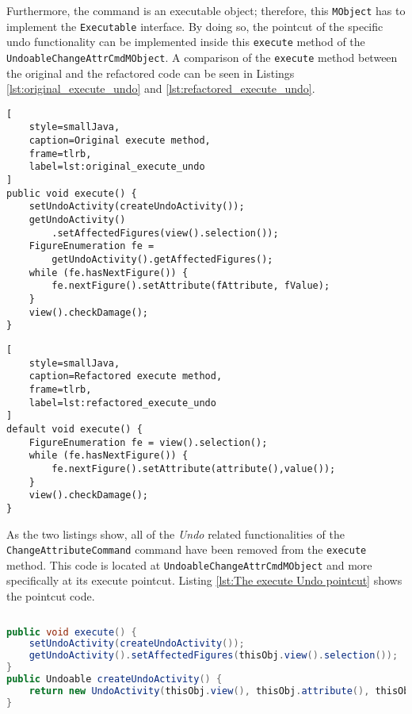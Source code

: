 Furthermore, the command is an executable object; therefore, this \texttt{MObject} has to implement the \texttt{Executable} interface.
By doing so, the pointcut of the specific undo functionality can be implemented inside this \texttt{execute} method of the \texttt{UndoableChangeAttrCmdMObject}.
A comparison of the \texttt{execute} method between the original and the refactored code can be seen in Listings \ref{lst:original_execute_undo} and \ref{lst:refactored_execute_undo}.
\newline
{}

\noindent\begin{minipage}{.45\textwidth}
\begin{lstlisting}[
	style=smallJava,
	caption=Original execute method,
	frame=tlrb,
	label=lst:original_execute_undo
]
public void execute() {
	setUndoActivity(createUndoActivity());
	getUndoActivity()
		.setAffectedFigures(view().selection());
	FigureEnumeration fe = 
	  	getUndoActivity().getAffectedFigures();
	while (fe.hasNextFigure()) {
		fe.nextFigure().setAttribute(fAttribute, fValue);
	}
	view().checkDamage();
}
\end{lstlisting}
\end{minipage}\hfill
\begin{minipage}{.45\textwidth}
\begin{lstlisting}[
	style=smallJava,
	caption=Refactored execute method,
	frame=tlrb,
	label=lst:refactored_execute_undo
]
default void execute() {
	FigureEnumeration fe = view().selection();
	while (fe.hasNextFigure()) {
		fe.nextFigure().setAttribute(attribute(),value());
	}
	view().checkDamage();
}
	\end{lstlisting}
\label{lst:execute_undo}
\end{minipage}

As the two listings show, all of the \textit{Undo} related functionalities of the \texttt{ChangeAttributeCommand} command have been removed from the \texttt{execute} method.
This code is located at \texttt{UndoableChangeAttrCmdMObject} and more specifically at its execute pointcut.
Listing \ref{lst:The execute Undo pointcut} shows the pointcut code.

\begin{sourcecode}
	\begin{lstlisting}[language=Java]
public void execute() {
	setUndoActivity(createUndoActivity());
	getUndoActivity().setAffectedFigures(thisObj.view().selection());
}
public Undoable createUndoActivity() {
	return new UndoActivity(thisObj.view(), thisObj.attribute(), thisObj.value());
}
    \end{lstlisting}
	\caption{The execute Undo pointcut}
	\label{lst:The execute Undo pointcut}
\end{sourcecode}


